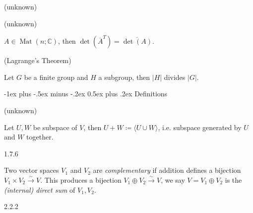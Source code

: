 \documentclass[10pt]{article} %
\makeatletter
\DeclareMathOperator{\Mat}{Mat}
\renewcommand{\section}{\@startsection{section}{1}{0mm}%
                                {-1ex plus -.5ex minus -.2ex}%
                                {0.5ex plus .2ex}%
                                {\normalfont\large\bfseries}}
\makeatother
\begin{document}
\begin{multicols}{3}
\begin{proposition}{(unknown)}{}
\end{proposition}

\begin{proposition}{(unknown)}{}

    $A \in \Mat(n;\mathbb{C})$, then $\det(\overline{A}^T) = \overline{\det(A)}$.

\end{proposition}

\begin{theorem}{(Lagrange's Theorem)}{}

    Let $G$ be a finite group and $H$ a subgroup, then $|H|$ divides $|G|$.

\end{theorem}




\section{Definitions}

\begin{definition}{(unknown)}{}

    Let $U,W$ be subspace of $V$, then $U + W \coloneqq \langle U \cup W \rangle$, i.e. subspace generated by $U$ and $W$ together.

\end{definition}

\begin{definition}{1.7.6}{}

    Two vector spaces $V_1$ and $V_2$ are \emph{complementary} if addition defines a bijection $V_1 \times V_2 \xrightarrow{\sim} V$. This produces a bijection $V_1 \oplus V_2 \xrightarrow{\sim} V$, we say $V = V_1 \oplus V_2$ is the \emph{(internal) direct sum} of $V_1, V_2$.

\end{definition}


\begin{definition}{2.2.2}{}


\end{definition}
\end{multicols}
\end{document}
